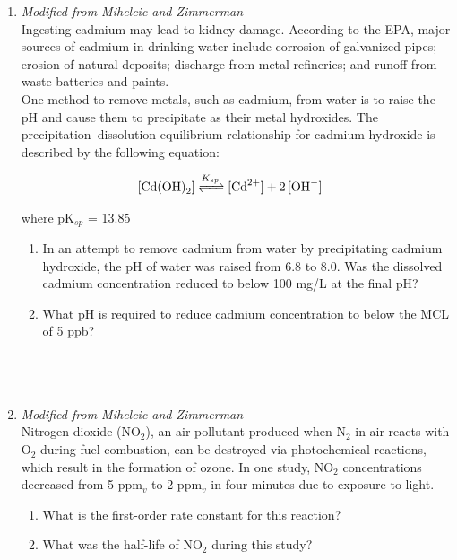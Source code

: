 \documentclass[12pt,letterpaper]{article}
\begin{document}
\begin{enumerate}

\item \emph {Modified from Mihelcic and Zimmerman}\\
Ingesting cadmium may lead to kidney damage.  According to the EPA, major sources of cadmium in drinking water include corrosion of galvanized pipes; erosion of natural deposits; discharge from metal refineries; and runoff from waste batteries and paints.\\

One method to remove metals, such as cadmium, from water is to raise the pH and cause them to precipitate as their metal hydroxides.  The precipitation--dissolution equilibrium relationship for cadmium hydroxide is described by the following equation: 

\begin{align*}
\cee{[Cd(OH)_2]  &<=>[K_{sp}] [Cd^{2+}] + 2[OH^-]}
\end{align*}

where pK$_{sp}$ = 13.85\\

\begin{enumerate}
\item In an attempt to remove cadmium from water by precipitating cadmium hydroxide, the pH of water was raised from 6.8 to 8.0.  Was the dissolved cadmium concentration reduced to below 100 mg/L at the final pH? 

\vspace{2.5in}

\item What pH is required to reduce cadmium concentration to below the MCL of 5 ppb?\\\\\\\\

\vspace{2in}

\end{enumerate}

\pagebreak

\vspace{5in}

\item \emph {Modified from Mihelcic and Zimmerman}\\

Nitrogen dioxide (NO$_2$), an air pollutant produced when N$_2$ in air reacts with O$_2$ during fuel combustion, can be destroyed via photochemical reactions, which result in the formation of ozone.  In one study, NO$_2$  concentrations decreased from 5 ppm$_v$ to 2 ppm$_v$ in four minutes due to exposure to light.  

\begin{enumerate}
\item What is the first-order rate constant for this reaction?
\vspace{3in}
\item What was the half-life of NO$_2$ during this study?
\end{enumerate}

\end{enumerate}
\end{document}
